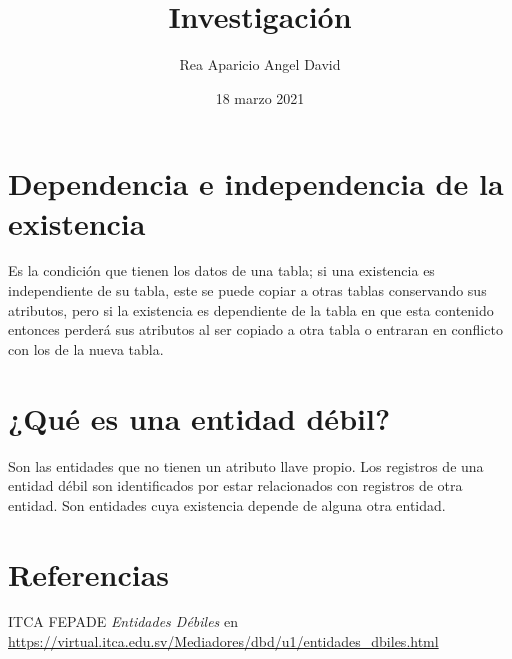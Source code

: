 \documentclass[letterpaper]{article}
\title{Investigación}
\author{Rea Aparicio Angel David}
\date{18 marzo 2021}
\begin{document}
\maketitle

\section*{Dependencia e independencia de la existencia}
Es la condición que tienen los datos de una tabla; si una existencia es independiente de su tabla, este se puede copiar a otras tablas conservando sus atributos, pero si la existencia es dependiente de la tabla en que esta contenido entonces perderá sus atributos al ser copiado a otra tabla o entraran en conflicto con los de la nueva tabla.
\section*{¿Qué es una entidad débil?}
Son las entidades que no tienen un atributo llave propio. Los registros de una entidad débil son identificados por estar relacionados con registros de otra entidad.
Son entidades cuya existencia depende de alguna otra entidad.
\section*{Referencias}
ITCA FEPADE \textit{Entidades Débiles} en \url{https://virtual.itca.edu.sv/Mediadores/dbd/u1/entidades_dbiles.html}
\end{document}
